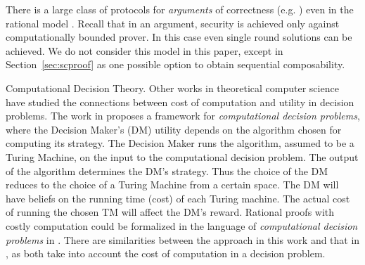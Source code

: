 \medskip
{}
There is a large class of protocols for {\em arguments} of correctness (e.g. \cite{ggp10,ggpr13,krr14}) even in the rational model \cite{ratargs,ratsumchecks}. Recall that in an argument, security is achieved only against computationally bounded prover. In this case even single round solutions can be achieved. We do not consider this model in this paper, except in Section~\ref{sec:scproof} as one possible option to obtain sequential composability. 

\medskip
\noindent
{\sc Computational Decision Theory.}
Other works in theoretical computer science have studied the connections between cost of computation and utility in decision problems.
The work in \cite{halpern2011don} proposes a framework for \emph{computational decision problems}, where the Decision Maker's (DM) utility depends on the algorithm chosen for computing its strategy.
The Decision Maker runs the algorithm, assumed to be a Turing Machine, on the input to the computational decision problem.
The output of the algorithm determines the DM's strategy. 
Thus the choice of the DM reduces to the choice of a Turing Machine from a certain space. The DM will have beliefs on the running time (cost) of each Turing machine. The actual cost of running the chosen TM will affect the DM's reward.
Rational proofs with costly computation could be formalized in the language of \emph{computational decision problems} in \cite{halpern2011don}. There are similarities between the approach in this
work and that in \cite{halpern2011don}, as both take into account the cost of computation in a decision problem.





